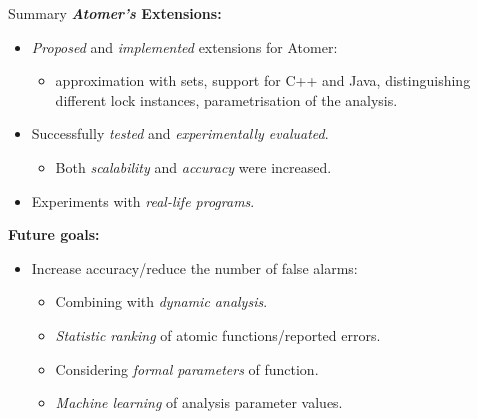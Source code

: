 \documentclass[10pt, xcolor=pdflatex, hyperref={unicode}, aspectratio=169]{beamer}
\begin{document}
\begin{frame}{Summary}
    \textbf{\emph{Atomer's} \alert{Extensions}:}
    \smallskip
    \begin{itemize}\setlength\itemsep{.8em}
        \item \emph{Proposed} and \emph{implemented} \alert{extensions for Atomer}:
            \smallskip
            \begin{itemize}
                \item approximation with sets, support for C++ and Java, distinguishing different lock instances, parametrisation of the analysis.
            \end{itemize}
            
        \item Successfully \emph{tested} and \emph{experimentally evaluated}.
            \smallskip
            \begin{itemize}
                \item Both \emph{scalability} and \emph{accuracy} were \alert{increased}.
            \end{itemize}
            
        \item Experiments with \emph{real-life programs}.
    \end{itemize}

    \medskip

    \textbf{Future goals:}
    \smallskip
    \begin{itemize}
        \item Increase \alert{accuracy}/reduce the number of \alert{false alarms}:
            \smallskip
            \begin{itemize}\setlength\itemsep{.5em}
                \item Combining with \emph{dynamic analysis}.

                \item \emph{Statistic ranking} of atomic functions/reported errors.
                
                \item Considering \emph{formal parameters} of function.
                
                \item \emph{Machine learning} of analysis parameter values.
            \end{itemize}
    \end{itemize}
\end{frame}
\end{document}
